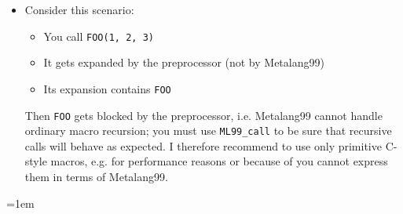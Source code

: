 \documentclass[12pt]{article}
\theoremstyle{break}
\begin{document}
\begin{itemize}
\item Consider this scenario:
    \begin{itemize}
        \item You call \texttt{FOO(1, 2, 3)}
        \item It gets expanded by the preprocessor (not by Metalang99)
        \item Its expansion contains \texttt{FOO}
    \end{itemize}
Then \texttt{FOO} gets blocked \cite{Bluepainting} by the preprocessor, i.e. Metalang99 cannot handle ordinary
macro recursion; you must use \texttt{ML99\_call} to be sure that recursive calls
will behave as expected. I therefore recommend to use only primitive C-style macros, e.g.
for performance reasons or because of you cannot express them in terms of Metalang99.
\end{itemize}

\emergencystretch=1em
\printbibliography
\end{document}
